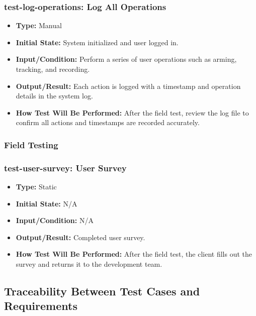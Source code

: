 \documentclass[12pt, titlepage]{article}
\begin{document}
\subsubsection*{test-log-operations: Log All Operations}
\begin{itemize}
  \item \textbf{Type:} Manual
  \item \textbf{Initial State:} System initialized and user logged in.
  \item \textbf{Input/Condition:} Perform a series of user operations such as arming, tracking, and recording.
  \item \textbf{Output/Result:} Each action is logged with a timestamp and operation details in the system log.
  \item \textbf{How Test Will Be Performed:} After the field test, review the log file to confirm all actions and timestamps are recorded accurately.
\end{itemize}

\subsubsection{Field Testing}

\subsubsection*{test-user-survey: User Survey}
\begin{itemize}
  \item \textbf{Type:} Static
  \item \textbf{Initial State:} N/A
  \item \textbf{Input/Condition:} N/A
  \item \textbf{Output/Result:} Completed user survey.
  \item \textbf{How Test Will Be Performed:} After the field test, the client fills out the survey and returns it to the development team.
\end{itemize}

\subsection{Traceability Between Test Cases and Requirements}

\end{document}
